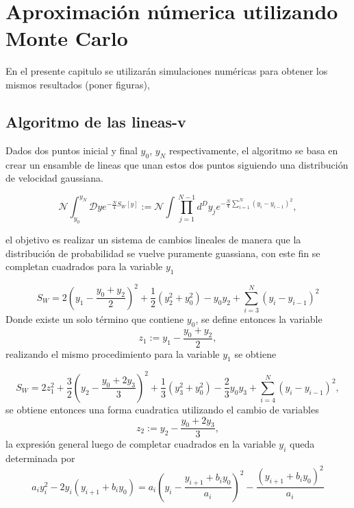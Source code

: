 \chapter{Aproximación númerica utilizando Monte Carlo}
{\label{cap.singular}}

En el presente capitulo se utilizarán simulaciones numéricas para obtener los mismos resultados  (poner figuras), 



\section{Algoritmo de las lineas-v}


Dados dos puntos inicial y final $ y_0$, $ y_N$ respectivamente, el algoritmo se basa en crear un ensamble de lineas que unan estos dos puntos siguiendo una distribución de velocidad gaussiana.
 


\begin{equation}
\mathcal{N} \int _{y_0} ^{y_N} \mathcal{D} y 
e^{-\frac{N}{4} S _{W} [y]} :=
\mathcal{N} \int \prod _{j=1} ^{N-1} d ^{D} y _{j} e^{- \frac{N}{4} \sum _{i=1} ^{N} ( y _i - y _{i-1} )^2 } ,
\end{equation}

el objetivo es realizar un sistema de cambios lineales de manera que la distribución de probabilidad se vuelve puramente guassiana, con este fin se completan cuadrados para la variable $ y_1$


\begin{equation}
S _{W} = 	2 \left( y _1 - \frac{y_0 + y_2}{2} \right) ^2 + 
			\frac{1}{2} \left( y ^2 _2 + y _0 ^2 \right)   -
			y _0 y_2 +
			\sum _{i = 3} ^{N} (y _i - y _{i-1}) ^2 
\end{equation}
Donde existe un solo término que contiene $y_0$, se define entonces la variable
\begin{equation}
z _1 := y_1 - \frac{y _0  + y_2 }{2} ,
\end{equation}
realizando el mismo procedimiento para la variable $y_1$ se obtiene


\begin{equation}
S _W = 2 z_1 ^2 +
		\frac{3}{2} \left( y _2 - \frac{y _0 + 2 y_3}{3} \right) ^2 +
		\frac{1}{3} \left( y _3 ^2 + y _0 ^2 \right) -
		\frac{2}{3} y_0 y_3 +
		\sum _{i = 4} ^{N} (y _i - y _{i-1}) ^2 
		,
\end{equation}
se obtiene entonces una forma cuadratica utilizando el cambio de variables 
\begin{equation}
z _2 := y_2 - \frac{y _0  + 2 y_3 }{3} ,
\end{equation}
la expresión general luego de completar cuadrados en la variable $y_i$ queda determinada por 
\begin{equation}
a _i y _i ^2 - 2 y_i ( y _{i+1} + b _i y_0 ) =
a _i \left( y _i - \frac{y _{i+1} + b_i y_0}{a_i} \right) ^2 -
\frac{\left( y _{i+1} + b_i y_0 \right) ^2}{a _i}
\end{equation}


